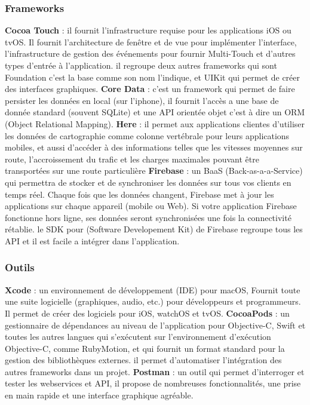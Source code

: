 \subsubsection{Frameworks} %
\label{ssub:subsubsection_name}
\begin{itemize}
	\itemb \textbf{Cocoa Touch} : il fournit l'infrastructure requise pour les applications iOS ou tvOS. Il fournit l'architecture de fenêtre et de vue pour implémenter l'interface, l'infrastructure de gestion des événements pour fournir Multi-Touch et d'autres types d'entrée à l'application.
	il regroupe deux autres frameworks qui sont Foundation c'est la base comme son nom l'indique, et UIKit
	qui permet de créer des interfaces graphiques.
	\itemb \textbf{Core Data} : c'est un framework qui permet de faire persister les données en local (sur l'iphone), il fournit l’accès a une base de donnée standard (souvent SQLite) et une API orientée objet c'est à dire un ORM (Object Relational Mapping).
	\itemb \textbf{Here} : il permet aux applications clientes d'utiliser les données de cartographie comme colonne vertébrale pour leurs applications mobiles, et aussi d'accéder à des informations telles que les vitesses moyennes sur route, l'accroissement du trafic et les charges maximales pouvant être transportées sur une route particulière
	\itemb \textbf{Firebase} : un BaaS (Back-as-a-a-Service) qui permettra de stocker et de synchroniser les données sur tous vos clients en temps réel. Chaque fois que les données changent, Firebase met à jour les applications sur chaque appareil (mobile ou Web). Si votre application Firebase fonctionne hors ligne, ses données seront synchronisées une fois la connectivité rétablie.\newline
	le SDK pour (Software Developement Kit) de Firebase regroupe tous les API et il est facile a intégrer dans l'application.
\end{itemize}

\subsubsection{Outils} %
\label{ssub:outils}
\begin{itemize}
	\itemb \textbf{Xcode} : un environnement de développement (IDE) pour macOS, Fournit toute une suite logicielle (graphiques, audio, etc.) pour développeurs et programmeurs. Il permet de créer des logiciels pour iOS, watchOS et tvOS.
	\itemb \textbf{CocoaPods} : un gestionnaire de dépendances au niveau de l'application pour Objective-C, Swift et toutes les autres langues qui s'exécutent sur l'environnement d'exécution Objective-C, comme RubyMotion, et qui fournit un format standard pour la gestion des bibliothèques externes. il permet d'automatiser l’intégration des autres frameworks dans un projet.
	\itemb \textbf{Postman} : un outil qui permet d'interroger et tester les webservices et API, il propose de nombreuses fonctionnalités, une prise en main rapide et une interface graphique agréable.
\end{itemize}

